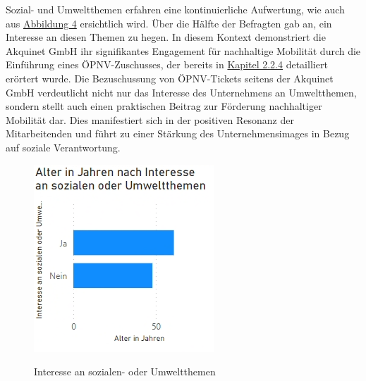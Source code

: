 Sozial- und Umweltthemen erfahren eine kontinuierliche Aufwertung, wie auch aus \hyperref[abb:umwelt]{Abbildung 4} ersichtlich wird. Über die Hälfte der Befragten gab an, ein Interesse an diesen Themen zu hegen. In diesem Kontext demonstriert die Akquinet GmbH ihr signifikantes Engagement für nachhaltige Mobilität durch die Einführung eines ÖPNV-Zuschusses, der bereits in \hyperref[sec:oepnvzuschuss]{Kapitel 2.2.4} detailliert erörtert wurde. Die Bezuschussung von ÖPNV-Tickets seitens der Akquinet GmbH verdeutlicht nicht nur das Interesse des Unternehmens an Umweltthemen, sondern stellt auch einen praktischen Beitrag zur Förderung nachhaltiger Mobilität dar. Dies manifestiert sich in der positiven Resonanz der Mitarbeitenden und führt zu einer Stärkung des Unternehmensimages in Bezug auf soziale Verantwortung.
\begin{figure}[H]
    \centering
    \includegraphics[scale = 0.7]{fig/umwelt.png}
    \label{abb:umwelt}
    \caption{Interesse an sozialen- oder Umweltthemen}
\end{figure}

